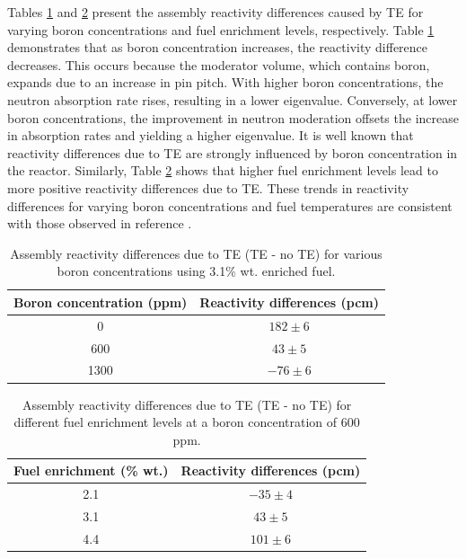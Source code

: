 Tables \ref{tab421} and \ref{tab422} present the assembly reactivity differences caused by TE for varying boron concentrations and fuel enrichment levels, respectively. Table \ref{tab421} demonstrates that as boron concentration increases, the reactivity difference decreases. This occurs because the moderator volume, which contains boron, expands due to an increase in pin pitch. With higher boron concentrations, the neutron absorption rate rises, resulting in a lower eigenvalue. Conversely, at lower boron concentrations, the improvement in neutron moderation offsets the increase in absorption rates and yielding a higher eigenvalue. It is well known that reactivity differences due to TE are strongly influenced by boron concentration in the reactor. Similarly, Table \ref{tab422} shows that higher fuel enrichment levels lead to more positive reactivity differences due to TE. These trends in reactivity differences for varying boron concentrations and fuel temperatures are consistent with those observed in reference \cite{palmtag}.

\begin{table}
    \centering
    \caption[Assembly reactivity differences for various boron concentrations]{Assembly reactivity differences due to TE (TE - no TE) for various boron concentrations using 3.1\% wt. enriched fuel.}
    \label{tab421} 
    \begin{tabular}{| c | c |}
    \hline 
     Boron concentration (ppm) & Reactivity differences (pcm) \\
     \hline
     0        & $182\pm6$     \\ \hline
     600      & $43\pm5$     \\ \hline
     1300     & $-76\pm6$    \\ \hline
    \end{tabular}
\end{table}

\begin{table}
    \centering
    \caption[Assembly reactivity differences for different fuel enrichments]{Assembly reactivity differences due to TE (TE - no TE) for different fuel enrichment levels at a boron concentration of 600 ppm.}
    \label{tab422} 
    \begin{tabular}{| c | c |}
    \hline 
    Fuel enrichment (\% wt.) & Reactivity differences (pcm) \\
     \hline
     2.1        & $-35\pm4$    \\ \hline
     3.1        & $43\pm5$     \\ \hline
     4.4        & $101\pm6$    \\ \hline
    \end{tabular}
\end{table}

